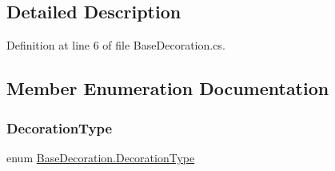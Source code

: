\subsection{Detailed Description}


Definition at line 6 of file Base\+Decoration.\+cs.



\subsection{Member Enumeration Documentation}
\mbox{\label{class_base_decoration_a8adb8095439bd24fd3c2058b2ecbbf11}} 
\subsubsection{\texorpdfstring{DecorationType}{DecorationType}}
{\footnotesize\ttfamily enum \mbox{\hyperlink{class_base_decoration_a8adb8095439bd24fd3c2058b2ecbbf11}{Base\+Decoration.\+Decoration\+Type}}\hspace{0.3cm}{\ttfamily [strong]}}

